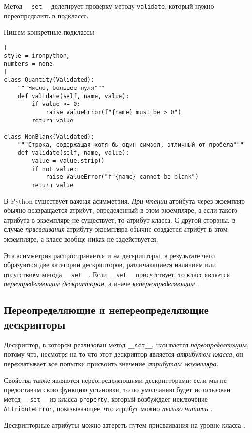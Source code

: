 \documentclass[%
	11pt,
	a4paper,
	utf8,
		]{article}
\begin{document}
Метод \verb|__set__| делегирует проверку методу \verb*|validate|, который нужно переопределить в подклассе.

Пишем конкретные подклассы
\begin{lstlisting}[
style = ironpython,
numbers = none
]
class Quantity(Validated):
    """Число, большее нуля"""
    def validate(self, name, value):
        if value <= 0:
            raise ValueError(f"{name} must be > 0")
        return value
        
class NonBlank(Validated):
    """Строка, содержащая хотя бы один символ, отличный от пробела"""
    def validate(self, name, value):
        value = value.strip()
        if not value:
            raise ValueError("f"{name} cannot be blank")
        return value
\end{lstlisting}

В Python существует важная асимметрия. \emph{При чтении} атрибута через экземпляр обычно возвращается атрибут, определенный в этом экземпляре, а если такого атрибута в экземпляре не существует, то атрибут класса. С другой стороны, в случае \emph{присваивания} атрибуту экземпляра обычно создается атрибут в этом экземпляре, а класс вообще никак не задействуется.

Эта асимметрия распространяется и на дескрипторы, в результате чего образуются две категории дескрипторов, различающиеся наличием или отсутствием метода \verb|__set__|. Если \verb*|__set__| присутствует, то класс является \emph{переопределяющим дескриптором}, а иначе \emph{непереопределяющим} \cite[]{ramalho:python-2022}.

\subsection{Переопределяющие и непереопределяющие дескрипторы}

Дескриптор, в котором реализован метод \verb|__set__|, называется \emph{переопределяющим}, потому что, несмотря на то что этот дескриптор является \emph{атрибутом класса}, он перехватывает все попытки присвоить значение \emph{атрибутам экземпляра}.

Свойства также являются переопределяющими дескрипторами: если мы не предоставим свою функцию установки, то по умолчанию будет использован метод \verb*|__set__| из класса \verb|property|, который возбуждает исключение \verb*|AttributeError|, показывающее, что атрибут можно \emph{только читать} \cite[]{ramalho:python-2022}.

Дескрипторные атрибуты можно затереть путем присваивания на уровне класса \cite[]{ramalho:python-2022}.
\end{document}
